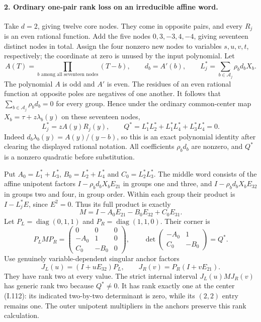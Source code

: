\paragraph{2. Ordinary one-pair rank loss on an irreducible affine word.}
Take $d=2$, giving twelve core nodes. They come in opposite pairs,
and every $R_j$ is an even rational function. Add the five nodes
$0,3,-3,4,-4$, giving seventeen distinct nodes in total. Assign
the four nonzero new nodes to variables $s,u,v,t$, respectively;
the coordinate at zero is unused by the input polynomial.
Let
\[
 A(T)=\prod_{b\text{ among all seventeen nodes}}(T-b),
 \qquad d_b=A'(b),\qquad
 L_j^*=\sum_{b\in\mathcal A_j}\rho_b d_bX_b.
 \tag{I.111}
\]
The polynomial $A$ is odd and $A'$ is even. The residues of an
even rational function at opposite poles are negatives of one
another. It follows that $\sum_{b\in\mathcal A_j}\rho_b d_b=0$
for every group. Hence under the ordinary common-center map
$X_b=\tau+z\lambda_b(y)$ on these seventeen nodes,
\[
 L_j^*=zA(y)R_j(y),\qquad
 Q^*=L_1^*L_2^*+L_1^*L_4^*+L_3^*L_4^*=0.
 \tag{I.112}
\]
Indeed $d_b\lambda_b(y)=A(y)/(y-b)$, so this is an exact
polynomial identity after clearing the displayed rational notation.
All coefficients $\rho_bd_b$ are nonzero, and $Q^*$ is a
nonzero quadratic before substitution.

Put $A_0=L_1^*+L_3^*$, $B_0=L_2^*+L_4^*$ and $C_0=L_2^*L_3^*$.
The middle word consists of the affine unipotent factors
$I-\rho_bd_bX_bE_{21}$ in groups one and three, and
$I-\rho_bd_bX_bE_{32}$ in groups two and four, in group order.
Within each group their product is $I-L_j^*E$, since $E^2=0$.
Thus its full product is exactly
\[
 M=I-A_0E_{21}-B_0E_{32}+C_0E_{31}.
 \tag{I.113}
\]
Let $P_L=\operatorname{diag}(0,1,1)$ and
$P_R=\operatorname{diag}(1,1,0)$. Their corner is
\[
 P_LMP_R=
 \begin{pmatrix}0&0&0\\-A_0&1&0\\C_0&-B_0&0\end{pmatrix},
 \qquad
 \det\begin{pmatrix}-A_0&1\\C_0&-B_0\end{pmatrix}=Q^*.
 \tag{I.114}
\]
Use genuinely variable-dependent singular anchor factors
\[
 J_L(u)=(I+uE_{32})P_L,\qquad
 J_R(v)=P_R(I+vE_{21}).
\]
They have rank two at every value. The strict internal interval
$J_L(u)M J_R(v)$ has generic rank two because $Q^*\ne0$.
It has rank exactly one at the center (I.112): its indicated
two-by-two determinant is zero, while its $(2,2)$ entry remains
one. The outer unipotent multipliers in the anchors preserve
this rank calculation.

